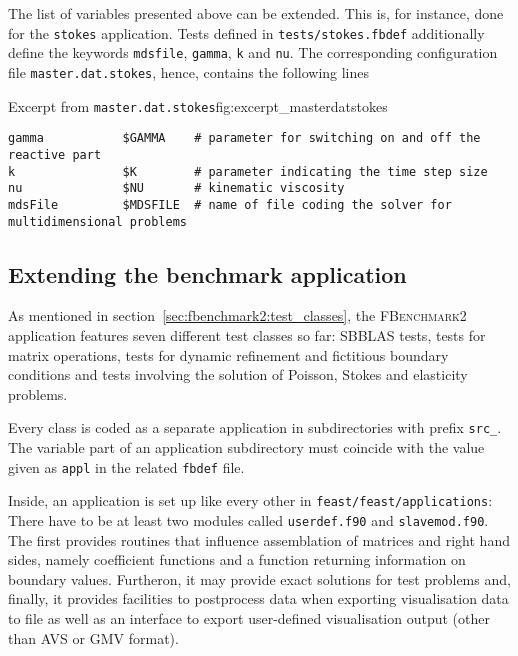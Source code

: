The list of variables presented above can be extended. This is, for instance,
done for the \texttt{stokes} application. Tests defined in \texttt{tests/stokes.fbdef}
additionally define the keywords \texttt{mdsfile}, \texttt{gamma}, \texttt{k}
and \texttt{nu}. The corresponding configuration file \texttt{master.dat.stokes},
hence, contains the following lines
\begin{code}{Excerpt from \texttt{master.dat.stokes}}{fig:excerpt_masterdatstokes}
\begin{verbatim}
gamma           $GAMMA    # parameter for switching on and off the reactive part
k               $K        # parameter indicating the time step size
nu              $NU       # kinematic viscosity
mdsFile         $MDSFILE  # name of file coding the solver for multidimensional problems
\end{verbatim}
\end{code}



\subsection{Extending the benchmark application}
\label{sec:fbenchmark2:extending_benchmark}

As mentioned in section~\ref{sec:fbenchmark2:test_classes}, the
\textsc{FBenchmark2} application features seven different test classes so far:
SBBLAS tests, tests for matrix operations, tests for dynamic refinement and
fictitious boundary conditions and tests involving the solution of Poisson, 
Stokes and elasticity problems.

Every class is coded as a separate application in subdirectories with prefix
\texttt{src\_}. The variable part of an application subdirectory must coincide with
the value given as \texttt{appl} in the related \texttt{fbdef} file.

Inside, an application is set up like every other in \texttt{feast/feast/applications}: 
There have to be at least two modules called \texttt{userdef.f90} and 
\texttt{slavemod.f90}. The first provides routines that influence assemblation
of matrices and right hand sides, namely coefficient functions and a function
returning information on boundary values. Furtheron, it may provide exact
solutions for test problems and, finally, it provides facilities to postprocess
data when exporting visualisation data to file as well as an interface to export
user-defined visualisation output (other than AVS or GMV format).

